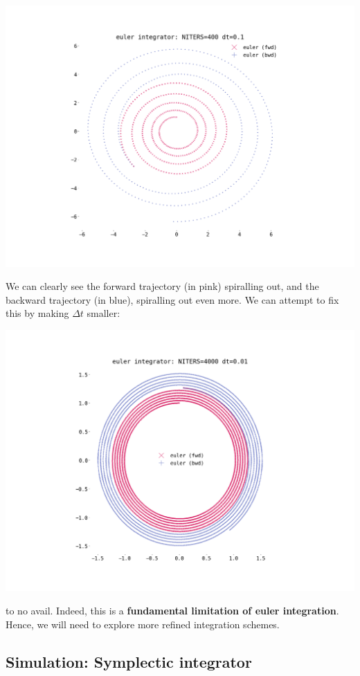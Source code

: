 \documentclass[titlepage]{article}
\begin{document}
\includegraphics[width=\textwidth]{./euler-dt-0-1.png}

We can clearly see the forward trajectory (in pink) spiralling out, and
the backward trajectory (in blue), spiralling out even more. We can attempt
to fix this by making $\Delta t$ smaller:

\includegraphics[width=\textwidth]{./euler-dt-0-01.png}


to no avail. Indeed, this is a \textbf{fundamental limitation of euler integration}.
Hence, we will need to explore more refined integration schemes.

\subsection{Simulation: Symplectic integrator}
\end{document}
